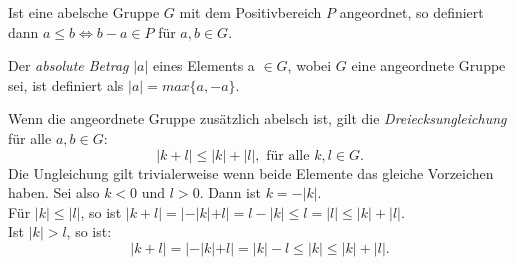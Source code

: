 \begin{bem}\label{angeordnetAbelsch} %
Ist eine abelsche Gruppe $G$ mit dem Positivbereich $P$ angeordnet, so definiert dann $a \leq b \Leftrightarrow b - a \in P$ für $a, b \in G$.
\end{bem}
\begin{defn} \label{betrag}
Der \textit{absolute Betrag} $|a|$ eines Elements a $\in  G$, wobei $G$ eine angeordnete Gruppe sei, ist definiert als $|a| = max\lbrace a, -a \rbrace$.
\end{defn}

Wenn die angeordnete Gruppe zusätzlich abelsch ist, gilt die \textit{Dreiecksungleichung} für alle $a, b \in G$:
\[|k+ l | \le |k| + |l|, \text{ für alle } k, l \in G.\]
Die Ungleichung gilt trivialerweise wenn beide Elemente das gleiche Vorzeichen haben. Sei also $k < 0$ und $l > 0$. Dann ist $k= -|k|$.\\
Für $|k|\le |l|$, so ist $|k + l |= |-|k|+l| = l - |k| \le l = |l|\le|k| + |l|$. \\
Ist $|k| >l$, so ist: 
\[|k+l| = |-|k| + l| = |k| - l \le |k|\le |k| + |l|.\]                                                                                                                       
%
\newpage
